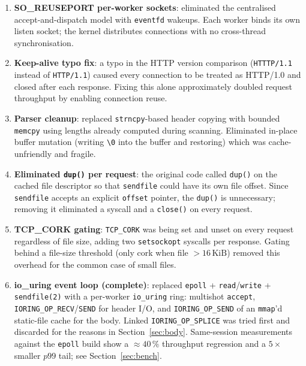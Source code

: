 \documentclass{article}
\begin{document}
\begin{enumerate}
    \item \textbf{SO\_REUSEPORT per-worker sockets}: eliminated the centralised
    accept-and-dispatch model with \texttt{eventfd} wakeups. Each worker binds its own
    listen socket; the kernel distributes connections with no cross-thread synchronisation.

    \item \textbf{Keep-alive typo fix}: a typo in the HTTP version comparison
    (\texttt{HTTTP/1.1} instead of \texttt{HTTP/1.1}) caused every connection to be treated
    as HTTP/1.0 and closed after each response. Fixing this alone approximately doubled
    request throughput by enabling connection reuse.

    \item \textbf{Parser cleanup}: replaced \texttt{strncpy}-based header copying with
    bounded \texttt{memcpy} using lengths already computed during scanning. Eliminated
    in-place buffer mutation (writing \texttt{\textbackslash{}0} into the buffer and
    restoring) which was cache-unfriendly and fragile.

    \item \textbf{Eliminated \texttt{dup()} per request}: the original code called
    \texttt{dup()} on the cached file descriptor so that \texttt{sendfile} could have its
    own file offset. Since \texttt{sendfile} accepts an explicit \texttt{offset} pointer,
    the \texttt{dup()} is unnecessary; removing it eliminated a syscall and a
    \texttt{close()} on every request.

    \item \textbf{TCP\_CORK gating}: \texttt{TCP\_CORK} was being set and unset on every
    request regardless of file size, adding two \texttt{setsockopt} syscalls per response.
    Gating behind a file-size threshold (only cork when file $> 16\,\mathrm{KiB}$) removed
    this overhead for the common case of small files.

    \item \textbf{io\_uring event loop (complete)}: replaced \texttt{epoll} +
    \texttt{read}/\texttt{write} + \texttt{sendfile(2)} with a per-worker
    \texttt{io\_uring} ring: multishot \texttt{accept}, \texttt{IORING\_OP\_RECV}/\texttt{SEND}
    for header I/O, and \texttt{IORING\_OP\_SEND} of an \texttt{mmap}'d static-file
    cache for the body. Linked \texttt{IORING\_OP\_SPLICE} was tried first and
    discarded for the reasons in Section~\ref{sec:body}. Same-session measurements
    against the \texttt{epoll} build show a $\approx 40\,\%$ throughput regression and
    a $5\times$ smaller $p99$ tail; see Section~\ref{sec:bench}.
\end{enumerate}
\end{document}
